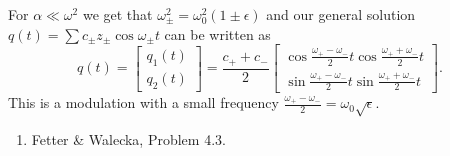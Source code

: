 \documentclass[letterpaper,11pt]{article}
\begin{document}
For $\alpha \ll \omega^2$ we get that $\omega_\pm^2 = \omega_0^2 (1 \pm \epsilon)$ and our general solution $q(t) = \sum c_\pm z_\pm \cos\omega_\pm t$ can be written as
\begin{equation*}
 q(t) = \left[ \begin{array}{cc} q_1(t) \\ q_2(t) \end{array} \right] = \frac{c_+ + c_-}{2} \left[ \begin{array}{cc} \cos\frac{\omega_+ - \omega_-}{2}t \cos\frac{\omega_+ + \omega_-}{2}t \\ \sin\frac{\omega_+ - \omega_-}{2}t \sin\frac{\omega_+ + \omega_-}{2}t \end{array} \right].
\end{equation*}
This is a modulation with a small frequency $\frac{\omega_+ - \omega_-}{2} = \omega_0\sqrt{\epsilon}$.


\begin{enumerate}[resume]
 \item Fetter \& Walecka, Problem 4.3.
\end{enumerate}
\end{document}
